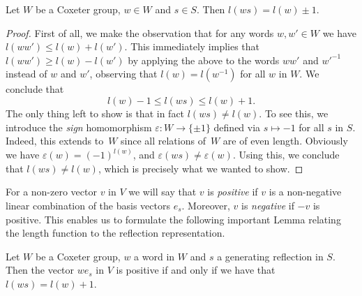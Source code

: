 \documentclass[main.tex]{subfiles}
\begin{document}
\begin{proposition}
	Let $W$ be a Coxeter group, $w \in W$ and $s \in S$. 
	Then $l(ws) = l(w) \pm 1$.
\end{proposition}

\begin{proof}
First of all, we make the observation that for any words 
$w, w' \in W$ we have $l(ww') \leq l(w) + l(w')$. This 
immediately implies that $l(ww') \geq l(w) - l(w')$ by applying 
the above to the words $ww'$ and $w'^{-1}$ instead of $w$ and 
$w'$, observing that $l(w) = l(w^{-1})$ for all $w$ in $W$. We 
conclude that
$$l(w) - 1 \leq l(ws) \leq l(w) + 1.$$
The only thing left to show is that in fact $l(ws) \neq l(w)$. 
To see this, we introduce the \textit{sign} homomorphism $
\varepsilon: W \rightarrow \{\pm 1\}$ defined via $s \mapsto -1$ 
for all $s$ in $S$. Indeed, this extends to~$W$ since all 
relations of~$W$ are of even length. Obviously we have 
$\varepsilon(w) = (-1)^{l(w)}$, and 
$\varepsilon(ws) \neq \varepsilon(w)$. 
Using this, we conclude that $l(ws) \neq l(w)$, which is 
precisely what we wanted to show.
\end{proof}

For a non-zero vector $v$ in $V$ we will say that $v$ is 
\textit{positive} if $v$ is a non-negative linear combination of 
the basis vectors $e_s$. Moreover, $v$ is \textit{negative} if 
$-v$ is positive. This enables us to formulate the following 
important Lemma relating the length function to the reflection 
representation.

\begin{lemma}\label{lem:humphreys5.4}
	Let $W$ be a Coxeter group, $w$ a word in $W$ and $s$ a 
	generating reflection in $S$. Then the vector $we_s$ in 
	$V$ is positive if and only if we have that 
	$l(ws) = l(w) + 1$.
\end{lemma}
\end{document}

